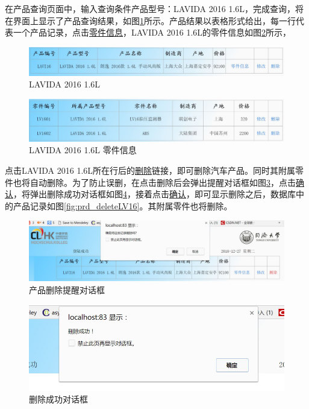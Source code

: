 在产品查询页面中，输入查询条件产品型号：LAVIDA 2016 1.6L，完成查询，将在界面上显示了产品查询结果，如图\ref{fig:LV16_prd_inf}所示。产品结果以表格形式给出，每一行代表一个产品记录，点击\underline{零件信息}，LAVIDA 2016 1.6L的零件信息如图\ref{fig:LV16_prd_part_inf}所示，
\begin{figure}[H]
\centering
\includegraphics[width=0.9\linewidth]{figure/LV16_prd_inf}
\caption{LAVIDA 2016 1.6L}
\label{fig:LV16_prd_inf}
\end{figure}

\begin{figure}[H]
\centering
\includegraphics[width=0.9\linewidth]{figure/LV16_prd_part_inf}
\caption{LAVIDA 2016 1.6L 零件信息}
\label{fig:LV16_prd_part_inf}
\end{figure}


点击LAVIDA 2016 1.6L所在行后的\underline{删除}链接，即可删除汽车产品。同时其附属零件也将自动删除。为了防止误删，在点击删除后会弹出提醒对话框如图\ref{fig:prd_delete_alert}，点击\underline{确认}，将弹出删除成功对话框如图\ref{fig:prd_delete_success_alert}，接着点击\underline{确认}，即可显示删除之后，数据库中的产品记录如图\ref{fig:prd_deleteLV16}。其附属零件也将删除。
\begin{figure}[H]
\centering
\includegraphics[width=0.8\linewidth]{figure/prd_delete_alert}
\caption{产品删除提醒对话框}
\label{fig:prd_delete_alert}
\end{figure}

\begin{figure}[H]
\centering
\includegraphics[width=0.7\linewidth]{figure/prd_delete_success_alert}
\caption{删除成功对话框}
\label{fig:prd_delete_success_alert}
\end{figure}

